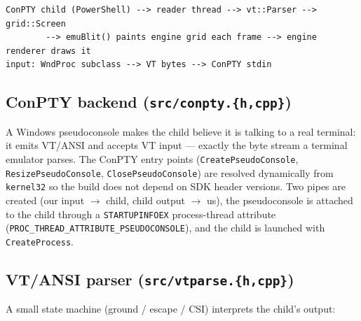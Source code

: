 \documentclass[11pt]{article}
\begin{document}
\begin{lstlisting}
ConPTY child (PowerShell) --> reader thread --> vt::Parser --> grid::Screen
        --> emuBlit() paints engine grid each frame --> engine renderer draws it
input: WndProc subclass --> VT bytes --> ConPTY stdin
\end{lstlisting}

\subsection{ConPTY backend (\texttt{src/conpty.\{h,cpp\}})}

A Windows pseudoconsole makes the child believe it is talking to a real terminal: it
emits VT/ANSI and accepts VT input --- exactly the byte stream a terminal emulator
parses. The ConPTY entry points (\texttt{CreatePseudoConsole},
\texttt{ResizePseudoConsole}, \texttt{ClosePseudoConsole}) are resolved dynamically
from \texttt{kernel32} so the build does not depend on SDK header versions. Two pipes
are created (our input $\rightarrow$ child, child output $\rightarrow$ us), the
pseudoconsole is attached to the child through a \texttt{STARTUPINFOEX} process-thread
attribute (\texttt{PROC_THREAD_ATTRIBUTE_PSEUDOCONSOLE}), and the child is launched
with \texttt{CreateProcess}.

\subsection{VT/ANSI parser (\texttt{src/vtparse.\{h,cpp\}})}

A small state machine (ground / escape / CSI) interprets the child's output:
\end{document}
